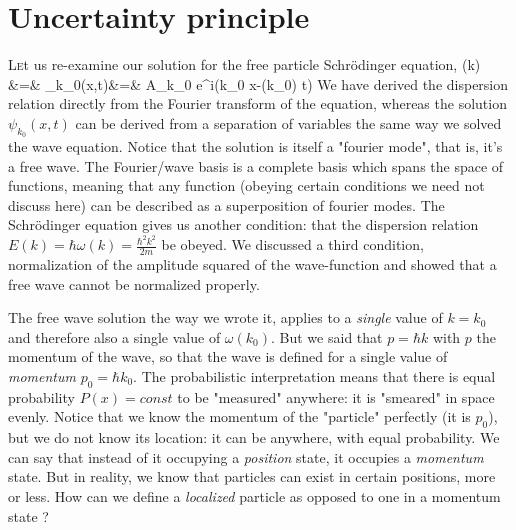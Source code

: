 \documentclass{Textbook}
\begin{document}
\chapter{Uncertainty principle}
\lettrine[lines=3,slope=6pt,nindent=6pt]{\initfamily L}{e}t us re-examine our solution for the free particle Schr{\"o}dinger equation,
\bea
\label{eq:freewavesol}
\hbar \omega(k) &=&  \nn
\psi_{k_0}(x,t)&=& A_{k_0} e^{i(k_0 x-\omega(k_0) t)} 
\eea
We have derived the dispersion relation directly from the Fourier transform of the equation, whereas the solution $\psi_{k_0}(x,t)$ can be derived from a separation of variables the same way we solved the wave equation. Notice that the solution is itself a "fourier mode", that is, it's a free wave. The Fourier/wave basis is a complete basis which spans the space of functions, meaning that any function (obeying certain conditions we need not discuss here) can be described as a superposition of fourier modes. The Schr{\"o}dinger equation gives us another condition: that the dispersion relation $E(k) = \hbar \omega(k) = \frac{\hbar^2k^2}{2m}$ be obeyed. We discussed a third condition, normalization of the amplitude squared of the wave-function and showed that a free wave cannot be normalized properly.

The free wave solution the way we wrote it, applies to a \emph{single} value of $k=k_0$ and therefore also a single value of $\omega(k_0)$. But we said that $p=\hbar k$ with $p$ the momentum of the wave, so that the wave is defined for a single value of \emph{momentum} $p_0=\hbar k_0$. The probabilistic interpretation means that there is equal probability $P(x) = const$ to be "measured" anywhere: it is "smeared" in space evenly. Notice that we know the momentum of the "particle" perfectly (it is $p_0$), but we do not know its location: it can be anywhere, with equal probability. We can say that instead of it occupying a \emph{position} state, it occupies a \emph{momentum} state. But in reality, we know that particles can exist in certain positions, more or less. How can we define a \emph{localized} particle as opposed to one in a momentum state ?
%
\end{document}
